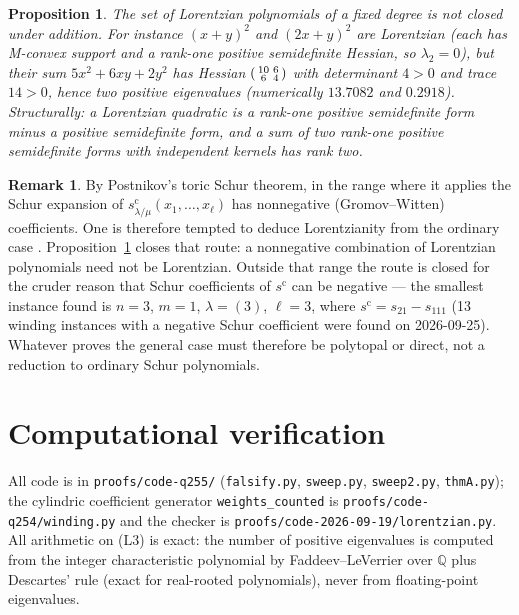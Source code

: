 \documentclass[11pt]{article}
\newtheorem{proposition}[theorem]{Proposition}
\theoremstyle{definition}
\newtheorem{remark}[theorem]{Remark}
\newcommand{\scy}{s^{\mathrm{c}}}
\begin{document}
\begin{proposition}\label{prop:notconvex}
The set of Lorentzian polynomials of a fixed degree is not closed under addition. For instance
$(x+y)^2$ and $(2x+y)^2$ are Lorentzian \emph{(}each has M-convex support and a rank-one
positive semidefinite Hessian, so $\lambda_2=0$\emph{)}, but their sum
$5x^2+6xy+2y^2$ has Hessian $\begin{psmallmatrix}10&6\\6&4\end{psmallmatrix}$ with determinant
$4>0$ and trace $14>0$, hence two positive eigenvalues (numerically $13.7082$ and $0.2918$).
Structurally: a Lorentzian quadratic is a rank-one positive semidefinite form minus a positive
semidefinite form, and a sum of two rank-one positive semidefinite forms with independent
kernels has rank two.
\end{proposition}

\begin{remark}\label{rem:schur-shut}
By Postnikov's toric Schur theorem, in the range where it applies the Schur expansion of
$\scy_{\lambda/\mu}(x_1,\dots,x_\ell)$ has nonnegative (Gromov--Witten) coefficients. One is
therefore tempted to deduce Lorentzianity from the ordinary case
\cite[Thm.~3]{HMMS}. Proposition~\ref{prop:notconvex} closes that route: a nonnegative
combination of Lorentzian polynomials need not be Lorentzian. Outside that range the route is
closed for the cruder reason that Schur coefficients of $\scy$ can be negative --- the smallest
instance found is $n=3$, $m=1$, $\lambda=(3)$, $\ell=3$, where
$\scy=s_{21}-s_{111}$ (13 winding instances with a negative Schur coefficient were found on
2026-09-25). Whatever proves the general case must therefore be polytopal or direct, not a
reduction to ordinary Schur polynomials.
\end{remark}

\section{Computational verification}\label{sec:comp}

All code is in \verb|proofs/code-q255/| (\verb|falsify.py|, \verb|sweep.py|, \verb|sweep2.py|,
\verb|thmA.py|); the cylindric coefficient generator \verb|weights_counted| is
\verb|proofs/code-q254/winding.py| and the checker is
\verb|proofs/code-2026-09-19/lorentzian.py|. All arithmetic on (L3) is exact: the number of
positive eigenvalues is computed from the integer characteristic polynomial by
Faddeev--LeVerrier over $\mathbb Q$ plus Descartes' rule (exact for real-rooted polynomials),
never from floating-point eigenvalues.
\end{document}
